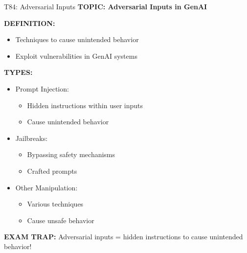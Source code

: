 \documentclass[8pt]{beamer}
\begin{document}
	\begin{frame}{T84: Adversarial Inputs}
		\fontsize{6.5}{7.5}\selectfont
		\textbf{TOPIC: Adversarial Inputs in GenAI}
		
		\vspace{0.1cm}
		\textbf{DEFINITION:}
		\begin{itemize}
			\item Techniques to cause unintended behavior
			\item Exploit vulnerabilities in GenAI systems
		\end{itemize}
		
		\vspace{0.1cm}
		\textbf{TYPES:}
		\begin{itemize}
			\item \textcolor{myblue}{Prompt Injection:}
			\begin{itemize}
				\item Hidden instructions within user inputs
				\item Cause unintended behavior
			\end{itemize}
			\item \textcolor{myblue}{Jailbreaks:}
			\begin{itemize}
				\item Bypassing safety mechanisms
				\item Crafted prompts
			\end{itemize}
			\item \textcolor{myblue}{Other Manipulation:}
			\begin{itemize}
				\item Various techniques
				\item Cause unsafe behavior
			\end{itemize}
		\end{itemize}
		
		\textcolor{myred}{\textbf{EXAM TRAP:}} Adversarial inputs = \textcolor{myblue}{hidden instructions to cause unintended behavior}!
	\end{frame}
	
\end{document}
